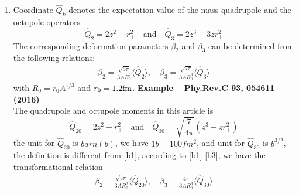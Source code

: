 \begin{itemize}[leftmargin=10pt]
\begin{enumerate}[leftmargin=10pt]
            \item Coordinate   \newline
                $\hat{Q}_k$ denotes the expectation value of the mass quadrupole and the octupole operators
                \begin{equation}
                    \hat{Q}_2 = 2z^2 - r_{\bot}^2 \quad \text{and} \quad \hat{Q}_3 = 2z^3 - 3zr_{\bot}^2    \label{b1}
                \end{equation}
                The corresponding deformation parameters $\beta_2$ and $\beta_3$ can be determined from the following relations:
                \begin{equation}
                    \begin{aligned}
                        \beta_2 = \frac{\sqrt{5\pi}}{3AR_0^2}\langle \hat{Q}_2 \rangle,   \quad
                        \beta_3 = \frac{\sqrt{7\pi}}{3AR_0^3}\langle \hat{Q}_3 \rangle  \label{b2}  
                    \end{aligned}
                \end{equation}
                with $R_0 = r_0 A^{1/3}$ and $r_0 = 1.2{\rm fm}$.\newline
                \textbf{Example -- Phy.Rev.C 93, 054611 (2016)}\\
                The quadrupole and octupole moments in this article is 
                \begin{equation}
                    \hat{Q}_{20} = 2z^2 - r_{\bot}^2 \quad \text{and} \quad \hat{Q}_{30} = \sqrt{\frac{7}{4\pi}}(z^3 - zr_{\bot}^2) \label{b3}
                \end{equation}
                the unit for $\hat{Q}_{20}$ is $barn(b)$, we have $1b = 100fm^2$, and unit for $\hat{Q}_{30}$ is $b^{3/2}$, the definition is different from \eqref{b1}, according to \eqref{b1}-\eqref{b3}, we have the transformational relation 
                \begin{equation}
                    \begin{aligned}
                        \beta_2 = \frac{\sqrt{5\pi}}{3AR_0^2}\langle \hat{Q}_{20} \rangle,   \quad
                        \beta_3 = \frac{4\pi}{3AR_0^3}\langle \hat{Q}_{30} \rangle
                    \end{aligned}
                \end{equation}


\end{enumerate}
\end{itemize}
